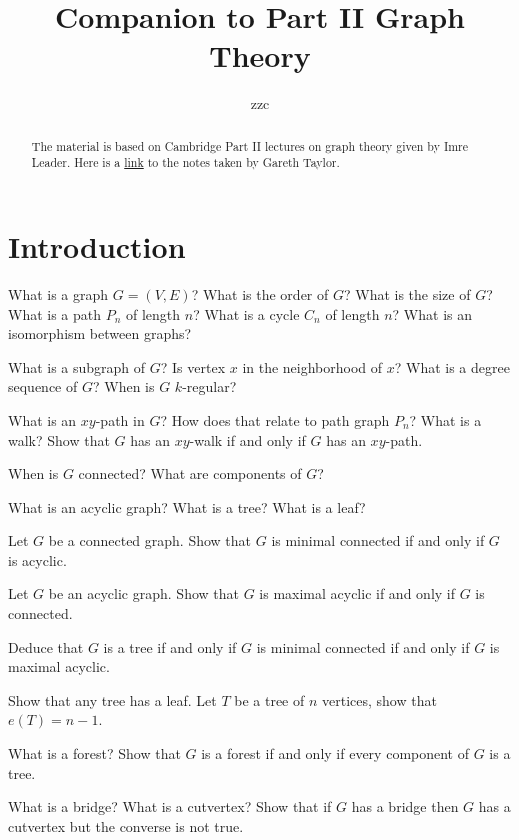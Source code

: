 


\title{Companion to Part II Graph Theory}
\author{zzc}
\maketitle

\rhead{\today}

\begin{abstract}
    The material is based on Cambridge Part II lectures on graph theory given by Imre Leader. Here is a \href{https://tartarus.org/gareth/maths/notes/ii/Graph_Theory.pdf}{link} to the notes taken by Gareth Taylor. 
\end{abstract}

\tableofcontents


\section{Introduction}
\begin{question}{1.1}
	What is a graph $G = (V,E)$? What is the order of $G$? What is the size of $G$? What is a path $P_n$ of length $n$? What is a cycle $C_n$ of length $n$? What is an isomorphism between graphs?
	
	What is a subgraph of $G$? Is vertex $x$ in the neighborhood of $x$? What is a degree sequence of $G$? When is $G$ $k$-regular?
	
	What is an $xy$-path in $G$? How does that relate to path graph $P_n$? What is a walk? Show that $G$ has an $xy$-walk if and only if $G$ has an $xy$-path.
	
	When is $G$ connected? What are components of $G$?
\end{question}

\begin{question}{1.2}
	What is an acyclic graph? What is a tree? What is a leaf? 
	
	Let $G$ be a connected graph. Show that $G$ is minimal connected if and only if $G$ is acyclic.
	
	Let $G$ be an acyclic graph. Show that $G$ is maximal acyclic if and only if $G$ is connected.
	
	Deduce that $G$ is a tree if and only if $G$ is minimal connected if and only if $G$ is maximal acyclic.
\end{question}

\begin{question}{1.3}
	Show that any tree has a leaf. Let $T$ be a tree of $n$ vertices, show that $e(T) = n-1$. 
	
	What is a forest? Show that $G$ is a forest if and only if every component of $G$ is a tree.
	
	What is a bridge? What is a cutvertex? Show that if $G$ has a bridge then $G$ has a cutvertex but the converse is not true.
\end{question}
	
